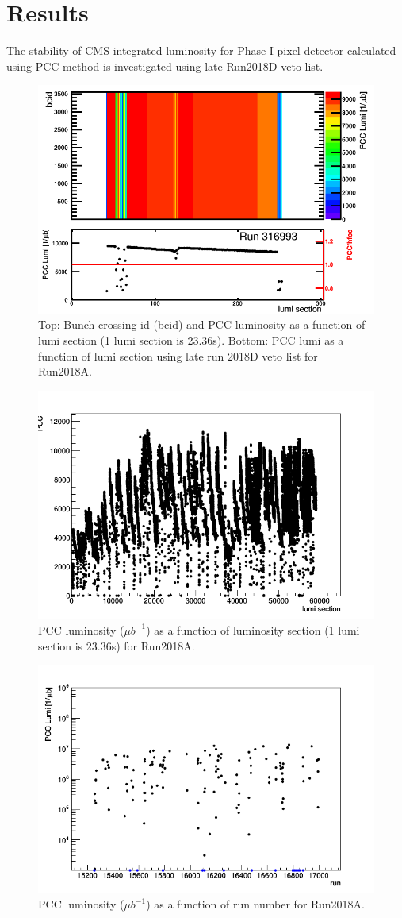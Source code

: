 \newpage \section{Results}
\label{sec:results}

The stability of CMS integrated luminosity for Phase I pixel detector calculated using PCC method is investigated using late Run2018D veto list.

\begin{figure}[H]
  \centering
  \includegraphics[width=0.52\columnwidth]{./316993.png}
  \caption{Top: Bunch crossing id (bcid) and PCC luminosity as a function of lumi section (1 lumi section is 23.36s). Bottom: PCC lumi as a function of lumi section using late run 2018D veto list for Run2018A.}
  \label{fig:CMS}
\end{figure}


\begin{figure}[H]
  \centering
  \includegraphics[width=0.52\columnwidth]{./ls_lumi.png}
  \caption{PCC luminosity ($\mu b^{-1}$) as a function of luminosity section (1 lumi section is 23.36s) for Run2018A.}
  \label{fig:CMS}
\end{figure}


\begin{figure}[H]
  \centering
  \includegraphics[width=0.52\columnwidth]{./runs.png}
  \caption{PCC luminosity ($\mu b^{-1}$) as a function of run number for Run2018A.}
  \label{fig:CMS}
\end{figure}


